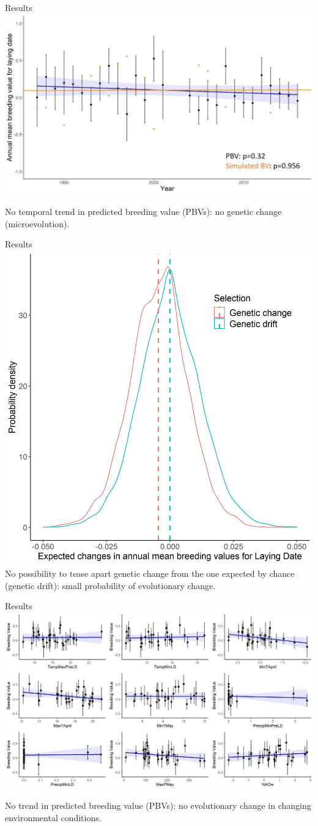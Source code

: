 \documentclass[compress]{beamer}
\begin{document}
\begin{frame}{Results}
\centering
 \includegraphics[height = 6.5 cm]{Chapter/BVVSdrift.png}  \\
 \raggedright
 No temporal trend in predicted breeding value (PBVs): no genetic change (microevolution).
\end{frame}

\begin{frame}{Results}
\centering\includegraphics[height = 6.5 cm]{Chapter/Drift.jpg}  \\
No possibility to tease apart genetic change from the one expected by chance (genetic drift): small probability of evolutionary change.

\end{frame}

\begin{frame}{Results}
\centering \includegraphics[height = 6 cm]{Chapter/BVVSenv.png}  \\
\raggedright
No trend in predicted breeding value (PBVs): no evolutionary change in changing environmental conditions.\\

\end{frame}
\end{document}

